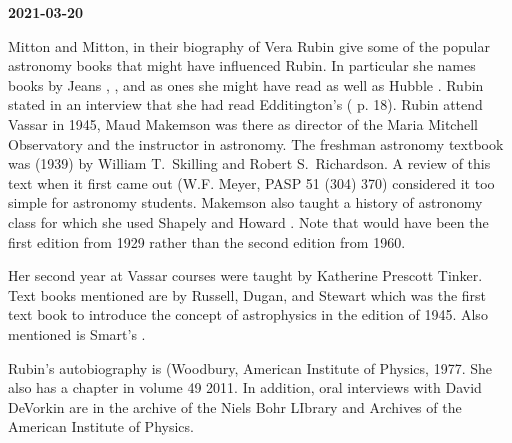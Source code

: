 

{\bf 2021-03-20}

Mitton and Mitton, in their biography of Vera Rubin
give some of the popular astronomy books that might have influenced
Rubin. In particular she names books by Jeans ,
, and  as
ones she might have read as well as Hubble . Rubin stated in an interview that she had read
Edditington's  (\cite{Mitton2021} p. 18).
Rubin attend Vassar in 1945, Maud Makemson was there as director of
the Maria Mitchell Observatory and the instructor in astronomy.  The
freshman astronomy textbook was  (1939) by William
T.~Skilling and Robert S.~Richardson. A review of this text when it
first came out (W.F. Meyer, PASP 51 (304) 370) considered it too
simple for astronomy students. Makemson also taught a history of
astronomy class for which she used Shapely and Howard . Note that would have been the first edition from
1929 rather than the second edition from 1960.

Her second year at Vassar courses were taught by Katherine Prescott
Tinker.  Text books mentioned are  by Russell, Dugan,
and Stewart which was the first text book to introduce the concept of
astrophysics in the  edition of 1945. Also mentioned is
Smart's .

Rubin's autobiography is  (Woodbury,
American Institute of Physics, 1977.  She also has a chapter
in  volume 49 2011.
In addition, oral interviews with David DeVorkin are in the archive of
the Niels Bohr LIbrary and Archives of the American Institute of
Physics.

